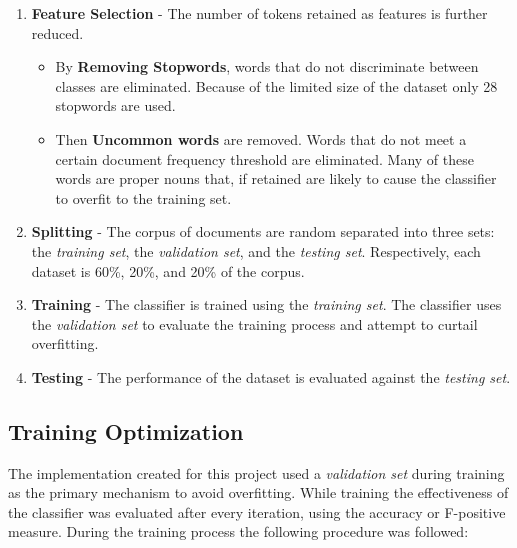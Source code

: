 \documentclass[final,3p,12pt]{elsarticle}
\begin{document}
\begin{enumerate}
    \item \textbf{Feature Selection} - The number of tokens retained as
        features is further reduced.
        \begin{itemize}

            \item By \textbf{Removing Stopwords}, words that do not
                discriminate between classes are eliminated. Because of the
                limited size of the dataset only 28 stopwords are used.

            \item Then \textbf{Uncommon words} are removed. Words that do not
                meet a certain document frequency threshold are eliminated.
                Many of these words are proper nouns that, if retained are
                likely to cause the classifier to overfit to the training set.

        \end{itemize}

    \item \textbf{Splitting} - The corpus of documents are random separated
        into three sets: the \textit{training set}, the \textit{validation set},
        and the \textit{testing set}. Respectively, each dataset is 60\%, 20\%,
        and 20\% of the corpus.

    \item \textbf{Training} - The classifier is trained using the
        \textit{training set}.  The classifier uses the \textit{validation set}
        to evaluate the training process and attempt to curtail overfitting.

    \item \textbf{Testing} - The performance of the dataset is evaluated
        against the \textit{testing set}.


\end{enumerate}

\subsection{Training Optimization}

The implementation created for this project used a \textit{validation set} during
training as the primary mechanism to avoid overfitting. While training the
effectiveness of the classifier was evaluated after every iteration, using the
accuracy or F-positive measure. During the training process the following
procedure was followed:
\end{document}
